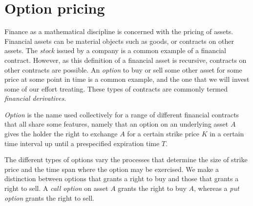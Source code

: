 \section{Option pricing}
Finance as a mathematical discipline is concerned with the pricing of
assets.  Financial assets can be material objects such as goods, or
contracts on other assets. The \emph{stock} issued by a company is a
common example of a financial contract. However, as this definition of
a financial asset is recursive, contracts on other contracts are
possible. An \emph{option} to buy or sell some other asset for some
price at some point in time is a common example, and the one that we
will invest some of our effort treating. These types of contracts are
commonly termed \emph{financial derivatives}.

\emph{Option} is the name used collectively for a range of different
financial contracts that all share some features, namely that an
option on an underlying asset $A$ gives the holder the right to
exchange $A$ for a certain strike price $K$ in a certain time interval
up until a prespecified expiration time $T$.

The different types of options vary the processes that determine the
size of strike price and the time span where the option may be
exercised.  We make a distinction between options that grants a right
to buy and those that grants a right to sell. A \emph{call option} on
asset $A$ grants the right to buy $A$, whereas a \emph{put option}
grants the right to sell.

